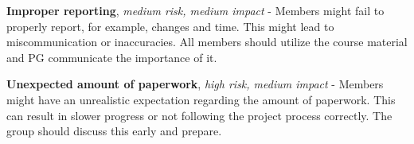 \documentclass{article}
\begin{document}
\textbf{Improper reporting}, \textit{medium risk, medium impact} - Members might fail to properly report, for example, changes and time. This might lead to miscommunication or inaccuracies. All members should utilize the course material and PG communicate the importance of it. 

\textbf{Unexpected amount of paperwork}, \textit{high risk, medium impact} - Members might have an unrealistic expectation regarding the amount of paperwork. This can result in slower progress or not following the project process correctly. The group should discuss this early and prepare. 



\end{document}
